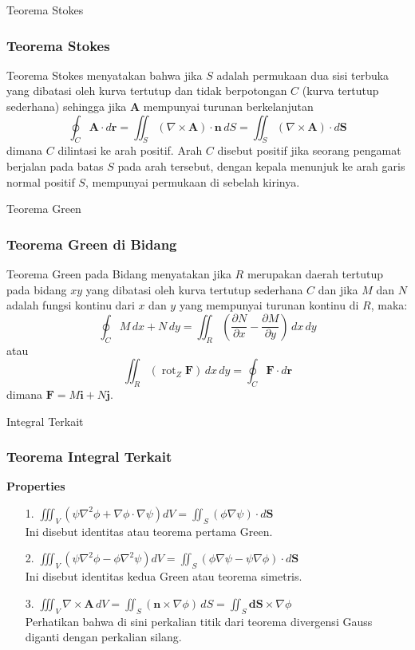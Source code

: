 \documentclass[10pt]{beamer}
\newcommand{\kiri}{\left}
\newcommand{\kanan}{\right}
\begin{document}
\begin{frame}{Teorema Stokes}
\frametitle{Teorema Stokes}
\justifying

\begin{theorem}
    Teorema Stokes menyatakan bahwa jika \( S \) adalah permukaan dua sisi terbuka yang dibatasi oleh kurva tertutup dan tidak berpotongan \( C \) (kurva tertutup sederhana) sehingga jika \( \mathbf{A} \) mempunyai turunan berkelanjutan
\[
\oint_C \mathbf{A} \cdot d\mathbf{r} = \iint_S (\nabla \times \mathbf{A}) \cdot \mathbf{n} \, dS = \iint_S (\nabla \times \mathbf{ A}) \cdot d\mathbf{S}
\]
dimana \( C \) dilintasi ke arah positif. Arah \( C \) disebut positif jika seorang pengamat berjalan pada batas \( S \) pada arah tersebut, dengan kepala menunjuk ke arah garis normal positif \( S \), mempunyai permukaan di sebelah kirinya.
\end{theorem}   
\end{frame}

\begin{frame}{Teorema Green}
\frametitle{Teorema Green di Bidang}
\begin{theorem}
\justifying
    Teorema Green pada Bidang menyatakan jika \( R \) merupakan daerah tertutup pada bidang \( xy \) yang dibatasi oleh kurva tertutup sederhana \( C \) dan jika \( M \) dan \( N \) adalah fungsi kontinu dari \( x \) dan \( y \) yang mempunyai turunan kontinu di \( R \), maka:
        \[
    \oint_C M \, dx + N \, dy = \iint_R \left( \frac{\partial N}{\partial x} - \frac{\partial M}{\partial y} \right) \, dx \, dy
    \]
    atau
    \[
    \iint_R (\operatorname{rot}_Z \mathbf{F}) \, dx \, dy = \oint_C \mathbf{F} \cdot d\mathbf{r}
    \]
    dimana $\mathbf{F} = M\mathbf{i} + N\mathbf{j}$.
\end{theorem}

\end{frame}

\begin{frame}{Integral Terkait}
\frametitle{Teorema Integral Terkait}    

\begin{theorem}
   \textbf{Properties}
   \begin{enumerate}
   \item[1.] $\iiint_V \kiri( \psi \nabla^2 \phi + \nabla \phi \cdot \nabla \psi \kanan) dV = \iint_S \kiri( \phi \nabla \psi \kanan) \cdot d\mathbf{S }$\\
   Ini disebut identitas atau teorema pertama Green.
   \item[2.] $\iiint_V \kiri( \psi \nabla^2 \phi - \phi \nabla^2 \psi \kanan) dV = \iint_S \kiri( \phi \nabla \psi - \psi \nabla \phi \kanan) \cdot d\mathbf{S}$\\
   Ini disebut identitas kedua Green atau teorema simetris. 
   \item[3.] $\iiint_V \nabla \times \mathbf{A} \, dV = \iint_S (\mathbf{n} \times \nabla \phi) \, dS = \iint_S \mathbf{dS} \times \nabla \phi$\\
   Perhatikan bahwa di sini perkalian titik dari teorema divergensi Gauss diganti dengan perkalian silang.
   \end{enumerate} 
\end{theorem}
\end{frame}
\end{document}
